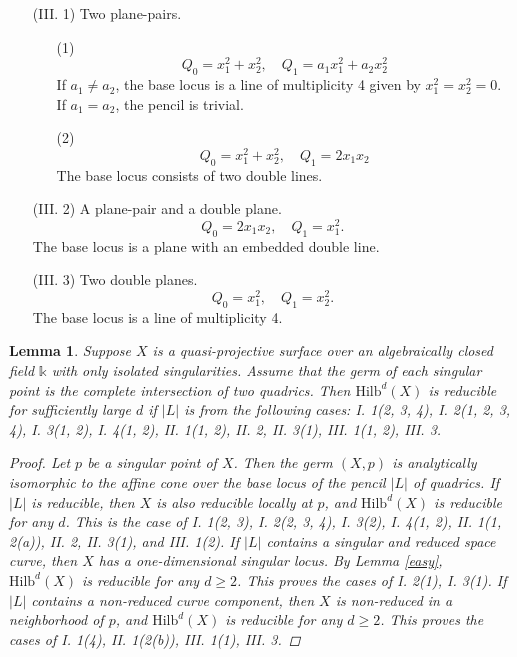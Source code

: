 \documentclass{amsart}[12pt]
\newtheorem{lemma}[theorem]{Lemma}
\theoremstyle{definition}
\theoremstyle{remark}
\numberwithin{equation}{section}
\newcommand{\abs}[1]{\lvert#1\rvert}
\begin{document}
\begin{itemize}
\item[(III. 1)] Two plane-pairs.
\begin{enumerate}
\item[(1)] 
\[ 
Q_0 = x_1^2 + x_2^2, \quad Q_1 =  a_1x_1^2 + a_2x_2^2
\]
If $a_1 \neq a_2$, the base locus is a line of multiplicity 4 given by $x_1^2 = x_2^2 = 0$. If $a_1 = a_2$, the pencil is trivial.

\item[(2)] 
\[ 
Q_0 = x_1^2 + x_2^2, \quad Q_1 =  2x_1x_2
\]
The base locus consists of two double lines.
\end{enumerate}
\item[(III. 2)] A plane-pair and a double plane.
\[
Q_0 = 2x_1x_2, \quad Q_1 = x_1^2.
\]
The base locus is a plane with an embedded double line.
\item[(III. 3)]  Two double planes.
\[
Q_0 = x_1^2, \quad Q_1 = x_2^2.
\]
The base locus is a line of multiplicity 4.
\end{itemize}

\begin{lemma}\label{pencil}
Suppose $X$ is a quasi-projective surface over an algebraically closed field $\mathbb{k}$ with only isolated singularities. Assume that the germ of each singular point is the complete intersection of two quadrics. Then $\mathrm{Hilb}^d(X)$ is reducible for sufficiently large $d$ if $\abs{L}$ is from the following cases: I. 1(2, 3, 4), I. 2(1, 2, 3, 4), I. 3(1, 2), I. 4(1, 2), II. 1(1, 2), II. 2, II. 3(1), III. 1(1, 2), III. 3.
\begin{proof}
Let $p$ be a singular point of $X$. Then the germ $(X, p)$ is analytically isomorphic to the affine cone over the base locus of the pencil $\abs{L}$ of quadrics. If $\abs{L}$ is reducible, then $X$ is also reducible locally at $p$, and $\mathrm{Hilb}^d(X)$ is reducible for any $d$. This is the case of I. 1(2, 3), I. 2(2, 3, 4), I. 3(2), I. 4(1, 2), II. 1(1, 2(a)), II. 2, II. 3(1), and III. 1(2). If $\abs{L}$ contains a singular and reduced space curve, then $X$ has a one-dimensional singular locus. By Lemma \ref{easy}, $\mathrm{Hilb}^d(X)$ is reducible for any $d \geq 2$. This proves the cases of I. 2(1), I. 3(1). If $\abs{L}$ contains a non-reduced curve component, then $X$ is non-reduced in a neighborhood of $p$, and $\mathrm{Hilb}^d(X)$ is reducible for any $d \geq 2$. This proves the cases of I. 1(4), II. 1(2(b)), III. 1(1), III. 3. 
\end{proof}
\end{lemma}
\end{document}
